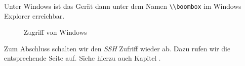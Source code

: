 \documentclass[12pt,a4paper]{article}
\newcommand{\code}[1]{\texttt{#1}}
\newcommand{\jpaimg}[2]{\begin{figure}[H]\centering\fbox{\texttt{[image: \#1]}}\caption{#2}\label{fig:#2}\end{figure}}
\begin{document}
Unter Windows ist das Gerät dann unter dem Namen \code{\textbackslash{}\textbackslash{}boombox} im Windows Explorer erreichbar.

\jpaimg{./../images/win-bb.png}{Zugriff von Windows}

Zum Abschluss schalten wir den \textit{SSH} Zufriff wieder ab. Dazu rufen wir die entsprechende Seite auf. Siehe hierzu auch Kapitel .

\clearpage{}
\listoffigures\thispagestyle{fancy}
\newpage


\renewcommand{\indexname}{Stichwortverzeichnis}
\clearpage{}
\printindex\thispagestyle{fancy}
\newpage
\end{document}
